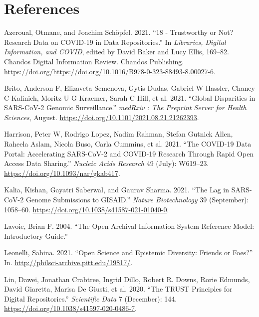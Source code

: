 \documentclass{article}
\newlength{\cslhangindent}
\newlength{\cslentryspacingunit} %
\newenvironment{CSLReferences}[2] %
 {%
  \setlength{\parindent}{0pt}
  \ifodd #1
  \let\oldpar\par
  \def\par{\hangindent=\cslhangindent\oldpar}
  \fi
  \setlength{\parskip}{#2\cslentryspacingunit}
 }%
 {}
\begin{document}
\hypertarget{references}{%
\section{References}\label{references}}

\hypertarget{refs}{}
\begin{CSLReferences}{1}{0}
\leavevmode\hypertarget{ref-AZEROUAL2021169}{}%
Azeroual, Otmane, and Joachim Schöpfel. 2021. {``18 - Trustworthy or
Not? Research Data on COVID-19 in Data Repositories.''} In
\emph{Libraries, Digital Information, and COVID}, edited by David Baker
and Lucy Ellis, 169--82. Chandos Digital Information Review. Chandos
Publishing.
https://doi.org/\url{https://doi.org/10.1016/B978-0-323-88493-8.00027-6}.

\leavevmode\hypertarget{ref-Brito2021}{}%
Brito, Anderson F, Elizaveta Semenova, Gytis Dudas, Gabriel W Hassler,
Chaney C Kalinich, Moritz U G Kraemer, Sarah C Hill, et al. 2021.
{``Global Disparities in SARS-CoV-2 Genomic Surveillance.''}
\emph{medRxiv : The Preprint Server for Health Sciences}, August.
\url{https://doi.org/10.1101/2021.08.21.21262393}.

\leavevmode\hypertarget{ref-Harrison2021}{}%
Harrison, Peter W, Rodrigo Lopez, Nadim Rahman, Stefan Gutnick Allen,
Raheela Aslam, Nicola Buso, Carla Cummins, et al. 2021. {``The COVID-19
Data Portal: Accelerating SARS-CoV-2 and COVID-19 Research Through Rapid
Open Access Data Sharing.''} \emph{Nucleic Acids Research} 49 (July):
W619--23. \url{https://doi.org/10.1093/nar/gkab417}.

\leavevmode\hypertarget{ref-Kalia2021}{}%
Kalia, Kishan, Gayatri Saberwal, and Gaurav Sharma. 2021. {``The Lag in
SARS-CoV-2 Genome Submissions to GISAID.''} \emph{Nature Biotechnology}
39 (September): 1058--60.
\url{https://doi.org/10.1038/s41587-021-01040-0}.

\leavevmode\hypertarget{ref-lavoie2004open}{}%
Lavoie, Brian F. 2004. {``The Open Archival Information System Reference
Model: Introductory Guide.''}

\leavevmode\hypertarget{ref-pittphilsci19817}{}%
Leonelli, Sabina. 2021. {``Open Science and Epistemic Diversity: Friends
or Foes?''} In. \url{http://philsci-archive.pitt.edu/19817/}.

\leavevmode\hypertarget{ref-Lin2020}{}%
Lin, Dawei, Jonathan Crabtree, Ingrid Dillo, Robert R. Downs, Rorie
Edmunds, David Giaretta, Marisa De Giusti, et al. 2020. {``The TRUST
Principles for Digital Repositories.''} \emph{Scientific Data} 7
(December): 144. \url{https://doi.org/10.1038/s41597-020-0486-7}.


\end{CSLReferences}
\end{document}
